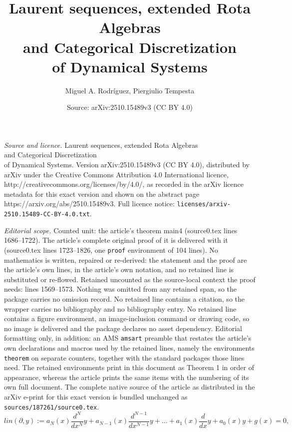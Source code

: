 \documentclass[10pt,a4paper]{amsart}
\title{Laurent sequences, extended Rota Algebras \\ and Categorical Discretization \\ of Dynamical Systems}
\author{Miguel A. Rodr\'iguez, Piergiulio Tempesta}
\date{Source: arXiv:2510.15489v3 (CC BY 4.0)}
\begin{document}
\maketitle

\noindent\emph{Source and licence.} Laurent sequences, extended Rota Algebras \\ and Categorical Discretization \\ of Dynamical Systems. Version arXiv:2510.15489v3 (CC BY 4.0), distributed by arXiv under the Creative Commons Attribution 4.0 International licence, http://creativecommons.org/licenses/by/4.0/, as recorded in the arXiv licence metadata for this exact version and shown on the abstract page https://arxiv.org/abs/2510.15489v3. Full licence notice: \texttt{licenses/arxiv-2510.15489-CC-BY-4.0.txt}.\par\smallskip

\noindent\textit{Editorial scope.} Counted unit: the article's theorem main4 (source0.tex lines 1686--1722). The article's complete original proof of it is delivered with it (source0.tex lines 1723--1826, one \texttt{proof} environment of 104 lines). No mathematics is written, repaired or re-derived: the statement and the proof are the article's own lines, in the article's own notation, and no retained line is substituted or re-flowed.  Retained uncounted as the source-local context the proof needs: lines 1569--1573.  Nothing was omitted from any retained span, so the package carries no omission record.  No retained line contains a citation, so the wrapper carries no bibliography and no bibliography entry.  No retained line contains a figure environment, an image-inclusion command or drawing code, so no image is delivered and the package declares no asset dependency.  Editorial formatting only, in addition: an AMS \texttt{amsart} preamble that restates the article's own declarations and macros used by the retained lines, namely the environments \texttt{theorem} on separate counters, together with the standard packages those lines need.  The retained environments print in this document as Theorem 1 in order of appearance, whereas the article prints the same items with the numbering of its own full document.  The complete native source of the article as distributed in the arXiv e-print for this exact version is bundled unchanged as \texttt{sources/187261/source0.tex}.
\begin{equation}
\label{eq:main3}
lin(\partial , y):=a_{N}(x) \frac{d^{N}}{dx^{N}}y + a_{N-1}(x)
\frac{d^{N-1}}{dx^{N-1}}y +\ldots +a_{1}(x) \frac{d}{dx} y+a_{0}(x) y +g(x)=0,
\end{equation}
\end{document}
